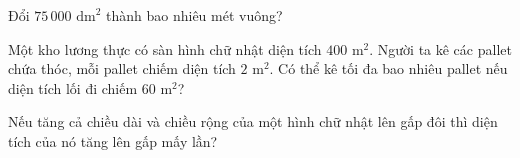\begin{ex}
  Đổi $75\,000\text{ dm}^2$ thành bao nhiêu mét vuông?
\end{ex}

\begin{ex}
  Một kho lương thực có sàn hình chữ nhật diện tích $400\text{ m}^2$. Người ta kê các pallet chứa thóc, mỗi pallet chiếm diện tích $2\text{ m}^2$. Có thể kê tối đa bao nhiêu pallet nếu diện tích lối đi chiếm $60\text{ m}^2$?
\end{ex}

\begin{ex}
  Nếu tăng cả chiều dài và chiều rộng của một hình chữ nhật lên gấp đôi thì diện tích của nó tăng lên gấp mấy lần?
\end{ex}
